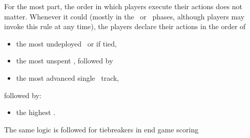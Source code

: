 For the most part, the order in which players execute their actions does not matter.  Whenever it could (mostly in the \diplomacy\ or \deployment\ phases, although players may invoke this rule at any time), the players declare their actions in the order of
\begin{itemize}
  \item the most undeployed \squadrons\, or if tied,
  \item the most unspent \currency, followed by
  \item the most advanced single \tech\ track,
\end{itemize}
followed by:
\begin{itemize}
  \item the highest \population.
\end{itemize}
The same logic is followed for tiebreakers in end game scoring
